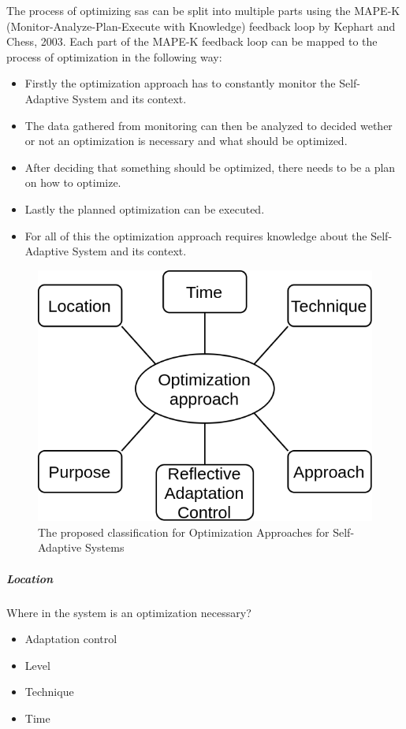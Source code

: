 The process of optimizing \acrlong{sas} can be split into multiple parts 
using the MAPE-K (Monitor-Analyze-Plan-Execute with Knowledge) feedback loop by Kephart and Chess, 2003\cite*{VisionOfAutonomicComputing}.
Each part of the MAPE-K feedback loop can be mapped to the process of optimization in the following way:
\begin{itemize}
    \item Firstly the optimization approach has to constantly monitor the Self-Adaptive System and its context.
    \item The data gathered from monitoring can then be analyzed to decided wether or not an optimization is necessary and what should be optimized.
    \item After deciding that something should be optimized, there needs to be a plan on how to optimize.
    \item Lastly the planned optimization can be executed.
    \item For all of this the optimization approach requires knowledge about the Self-Adaptive System and its context.
\end{itemize}


\begin{figure}
    \centering
    \includegraphics[width=0.6\columnwidth]{images/ClassificationProposal-Proposal.png}
    \caption{The proposed classification for Optimization Approaches for Self-Adaptive Systems}
\end{figure}

\subparagraph*{Location}
Where in the system is an optimization necessary? \\

\begin{itemize}
    \item Adaptation control
    \item Level
    \item Technique
    \item Time
\end{itemize}

